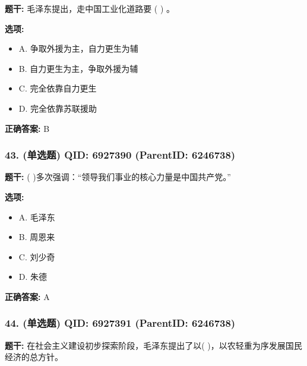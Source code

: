 \documentclass[12pt,UTF8]{ctexart}
\begin{document}
\textbf{题干:}
毛泽东提出，走中国工业化道路要 ( ) 。



\textbf{选项:}
\begin{itemize}[leftmargin=*]

  \item A. 争取外援为主，自力更生为辅

  \item B. 自力更生为主，争取外援为辅

  \item C. 完全依靠自力更生

  \item D. 完全依靠苏联援助

\end{itemize}

\textbf{正确答案:}
B

\vspace{0.3em}\hrulefill\vspace{0.7em}

\subsubsection*{43. (单选题) \small QID: 6927390 (ParentID: 6246738)}

\textbf{题干:}
(      )多次强调：“领导我们事业的核心力量是中国共产党。”



\textbf{选项:}
\begin{itemize}[leftmargin=*]

  \item A. 毛泽东

  \item B. 周恩来

  \item C. 刘少奇

  \item D. 朱德

\end{itemize}

\textbf{正确答案:}
A

\vspace{0.3em}\hrulefill\vspace{0.7em}

\subsubsection*{44. (单选题) \small QID: 6927391 (ParentID: 6246738)}

\textbf{题干:}
在社会主义建设初步探索阶段，毛泽东提出了以(              )，以农轻重为序发展国民经济的总方针。
\end{document}
